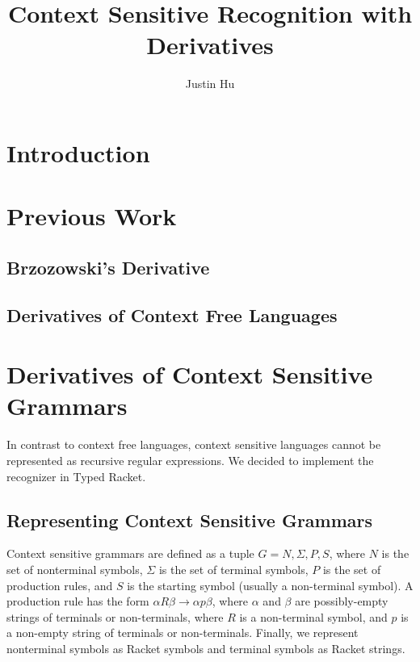 \documentclass[letterpaper,12pt,draft]{article}
\begin{document}
\title{Context Sensitive Recognition with Derivatives}
\author{Justin Hu}

\maketitle

\begin{abstract}
\end{abstract}

\section{Introduction}

\section{Previous Work}

\subsection{Brzozowski's Derivative}

\subsection{Derivatives of Context Free Languages}

\section{Derivatives of Context Sensitive Grammars}

In contrast to context free languages, context sensitive languages cannot be represented as recursive regular expressions. We decided to implement the recognizer in Typed Racket.

\subsection{Representing Context Sensitive Grammars}

Context sensitive grammars are defined as a tuple \(G = N, \Sigma, P, S\), where \(N\) is the set of nonterminal symbols, \(\Sigma\) is the set of terminal symbols, \(P\) is the set of production rules, and \(S\) is the starting symbol (usually a non-terminal symbol). A production rule has the form \(\alpha R \beta \to \alpha p \beta\), where \(\alpha\) and \(\beta\) are possibly-empty strings of terminals or non-terminals, where \(R\) is a non-terminal symbol, and \(p\) is a non-empty string of terminals or non-terminals. Finally, we represent nonterminal symbols as Racket symbols and terminal symbols as Racket strings.
\end{document}
